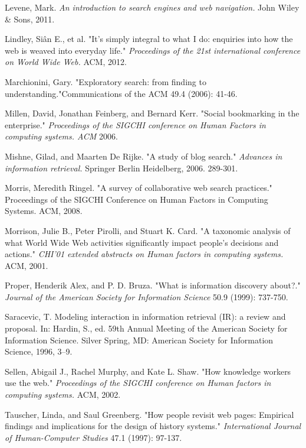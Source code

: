 \documentclass{casconpaper}
\begin{document}
{{\begin{thebibliography}{9}
Levene, Mark.  \emph{An introduction to search engines and web navigation.} John Wiley \& Sons, 2011.

Lindley, Siân E., et al. "It's simply integral to what I do: enquiries into how the web is weaved into everyday life." \emph{Proceedings of the 21st international conference on World Wide Web.} ACM, 2012.


Marchionini, Gary. "Exploratory search: from finding to understanding."Communications of the ACM 49.4 (2006): 41-46.



Millen, David, Jonathan Feinberg, and Bernard Kerr. "Social bookmarking in the enterprise." \emph{Proceedings of the SIGCHI conference on Human Factors in computing systems. ACM} 2006.

Mishne, Gilad, and Maarten De Rijke. "A study of blog search." \emph{Advances in information retrieval.} Springer Berlin Heidelberg, 2006. 289-301.

Morris, Meredith Ringel. "A survey of collaborative web search practices." Proceedings of the SIGCHI Conference on Human Factors in Computing Systems. ACM, 2008.

Morrison, Julie B., Peter Pirolli, and Stuart K. Card. "A taxonomic analysis of what World Wide Web activities significantly impact people's decisions and actions." \emph{CHI'01 extended abstracts on Human factors in computing systems.} ACM, 2001.

Proper, Henderik Alex, and P. D. Bruza. "What is information discovery about?." \emph{Journal of the American Society for Information Science} 50.9 (1999): 737-750.

Saracevic, T. Modeling interaction in information retrieval (IR): a review
and proposal. In: Hardin, S., ed. 59th Annual Meeting of the American
Society for Information Science. Silver Spring, MD: American Society for
Information Science, 1996, 3–9.

Sellen, Abigail J., Rachel Murphy, and Kate L. Shaw. "How knowledge workers use the web." \emph{Proceedings of the SIGCHI conference on Human factors in computing systems.} ACM, 2002.

Tauscher, Linda, and Saul Greenberg. "How people revisit web pages: Empirical findings and implications for the design of history systems." \emph{International Journal of Human-Computer Studies} 47.1 (1997): 97-137.


\end{thebibliography}}}
\end{document}
